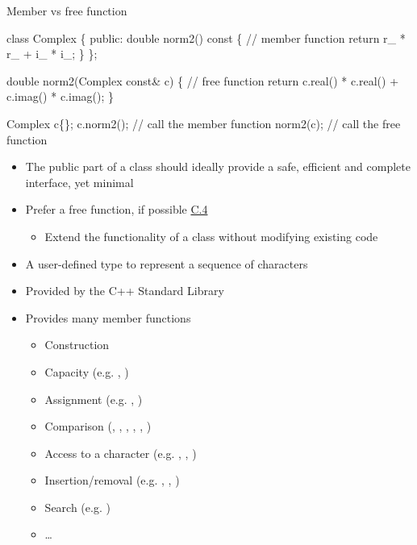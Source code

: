 \begin{frame}[fragile]{Member vs free function}
  \begin{codeblock}
class Complex \{
 public:
  double norm2() const \{ // \alert<1>{member function}
    return r_ * r_ + i_ * i_;
  \}
  \ddd
\};

double norm2(Complex const& c) \{ // \alert<1>{free function}
  return c.real() * c.real() + c.imag() * c.imag();
\}

Complex c\{\ddd\};
c.norm2(); // call the member function
norm2(c);  // call the free function\end{codeblock}

  \pause
  \begin{itemize}
  \item The public part of a class should ideally provide a safe, efficient and
    complete interface, yet minimal
  \item Prefer a free function, if possible
    \href{https://isocpp.github.io/CppCoreGuidelines/CppCoreGuidelines#c4-make-a-function-a-member-only-if-it-needs-direct-access-to-the-representation-of-a-class}{C.4}
    \begin{itemize}
    \item Extend the functionality of a class without modifying existing code
    \end{itemize}
  \end{itemize}

\end{frame}

\begin{frame}[fragile]{ \insertcontinuationtext}

  \begin{itemize}

  \item A user-defined type to represent a sequence of characters
  \item Provided by the C++ Standard Library
  \item Provides many member functions
    \begin{itemize}
    \item Construction
    \item Capacity (e.g. , )
    \item Assignment (e.g. \code{=}, )
    \item Comparison (\code{==}, \code{!=}, \code{<}, \code{>}, \code{<=}, \code{>=})
    \item Access to a character (e.g. \code{[]}, , )
    \item Insertion/removal (e.g. , , )
    \item Search (e.g. )
    \item \ldots
    \end{itemize}
  \end{itemize}

\end{frame}

